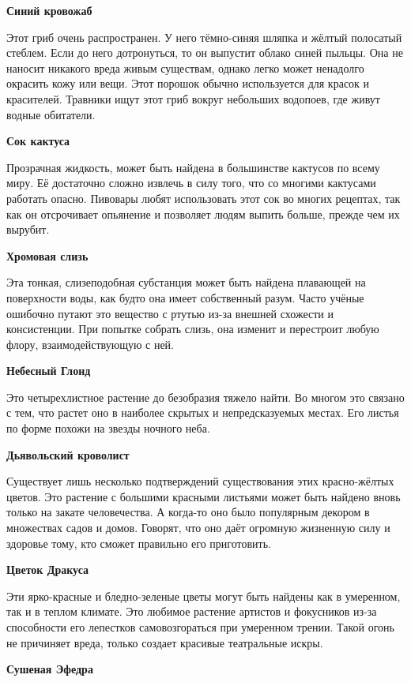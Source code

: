 \documentclass[a4paper, 9pt, twocolumn]{book}
\newcommand{\partc}[2][]{{
		\bigskip
		\noindent
		\hspace{-0.25cm}
		\fontsize{11pt}{13.2}
		\color{sectioncolor}
		\textbf{#2}}
	
	{
		\ifx\relax#1\relax
		\else
		\noindent
		\normalcolor
		\textbf{#1}}
	\bigskip
	\fi
}
\begin{document}
	\partc{Синий кровожаб}
	
	\noindent Этот гриб очень распространен. У него тёмно-синяя шляпка и жёлтый полосатый стеблем. Если до него дотронуться, то он выпустит облако синей пыльцы. Она не наносит никакого вреда живым существам, однако легко может ненадолго окрасить кожу или вещи. Этот порошок обычно используется для красок и красителей. Травники ищут этот гриб вокруг небольших водопоев, где живут водные обитатели.
	
	\partc{Сок кактуса}
	
	\noindent Прозрачная жидкость, может быть найдена в большинстве кактусов по всему миру. Её достаточно сложно извлечь в силу того, что со многими кактусами работать опасно. Пивовары любят использовать этот сок во многих рецептах, так как он отсрочивает опьянение и позволяет людям выпить больше, прежде чем их вырубит.
	
	\partc{Хромовая слизь}
	
	\noindent Эта тонкая, слизеподобная субстанция может быть найдена плавающей на поверхности воды, как будто она имеет собственный разум. Часто учёные ошибочно путают это вещество с ртутью из-за внешней схожести и консистенции. При попытке собрать слизь, она изменит и перестроит любую флору, взаимодействующую с ней.
	
	\partc{Небесный Глонд}
	
	\noindent Это четырехлистное растение до безобразия тяжело найти. Во многом это связано с тем, что растет оно в наиболее скрытых и непредсказуемых местах. Его листья по форме похожи на звезды ночного неба.
	
	\partc{Дьявольский кроволист}
	
	\noindent Существует лишь несколько подтверждений существования этих красно-жёлтых цветов. Это растение с большими красными листьями может быть найдено вновь только на закате человечества. А когда-то оно было популярным декором в множествах садов и домов. Говорят, что оно даёт огромную жизненную силу и здоровье тому, кто сможет правильно его приготовить.
	
	\partc{Цветок Дракуса}
	
	\noindent Эти ярко-красные и бледно-зеленые цветы могут быть найдены как в умеренном, так и в теплом климате. Это любимое растение артистов и фокусников из-за способности его лепестков самовозгораться при умеренном трении. Такой огонь не причиняет вреда, только создает красивые театральные искры.
	
	\partc{Сушеная Эфедра}
	
\end{document}
